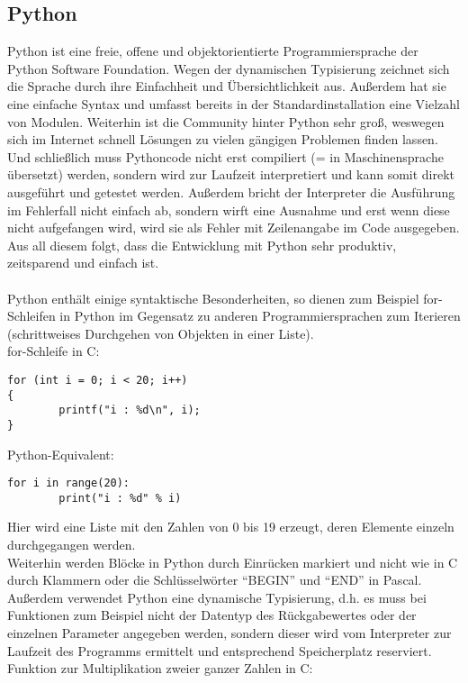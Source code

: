 \documentclass[hidelinks]{article}
\begin{document}
\subsection{Python}
Python ist eine freie, offene und objektorientierte Programmiersprache der Python Software Foundation. Wegen der dynamischen Typisierung zeichnet sich die Sprache durch ihre Einfachheit und Übersichtlichkeit aus. Außerdem hat sie eine einfache Syntax und umfasst bereits in der Standardinstallation eine Vielzahl von Modulen. Weiterhin ist die Community hinter Python sehr groß, weswegen sich im Internet schnell Lösungen zu vielen gängigen Problemen finden lassen. Und schließlich muss Pythoncode nicht erst compiliert (= in Maschinensprache übersetzt) werden, sondern wird zur Laufzeit interpretiert und kann somit direkt ausgeführt und getestet werden. Außerdem bricht der Interpreter die Ausführung im Fehlerfall nicht einfach ab, sondern wirft eine Ausnahme und erst wenn diese nicht aufgefangen wird, wird sie als Fehler mit Zeilenangabe im Code ausgegeben. Aus all diesem folgt, dass die Entwicklung mit Python sehr produktiv, zeitsparend und einfach ist.\cite{WhatIsPython}\\
\\
Python enthält einige syntaktische Besonderheiten, so dienen zum Beispiel for-Schleifen in Python im Gegensatz zu anderen Programmiersprachen zum Iterieren (schrittweises Durchgehen von Objekten in einer Liste).\\
for-Schleife in C:
\begin{lstlisting}
for (int i = 0; i < 20; i++)
{
        printf("i : %d\n", i);
}
\end{lstlisting}
Python-Equivalent:
\begin{lstlisting}
for i in range(20):
        print("i : %d" % i)
\end{lstlisting}
Hier wird eine Liste mit den Zahlen von 0 bis 19 erzeugt, deren Elemente einzeln durchgegangen werden.\\
Weiterhin werden Blöcke in Python durch Einrücken markiert und nicht wie in C durch Klammern oder die Schlüsselwörter ``BEGIN'' und ``END'' in Pascal.\\
Außerdem verwendet Python eine dynamische Typisierung, d.h. es muss bei Funktionen zum Beispiel nicht der Datentyp des Rückgabewertes oder der einzelnen Parameter angegeben werden, sondern dieser wird vom Interpreter zur Laufzeit des Programms ermittelt und entsprechend Speicherplatz reserviert.\\
Funktion zur Multiplikation zweier ganzer Zahlen in C:
\end{document}
